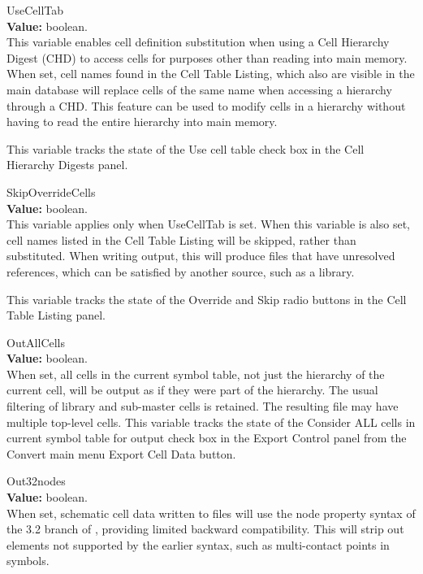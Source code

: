 \begin{description}
\item{\et UseCellTab}\\
{\bf Value:} boolean.\\
This variable enables cell definition substitution when using a Cell
Hierarchy Digest (CHD) to access cells for purposes other than reading
into main memory.  When set, cell names found in the {\cb Cell Table
Listing}, which also are visible in the main database will replace
cells of the same name when accessing a hierarchy through a CHD.  This
feature can be used to modify cells in a hierarchy without having to
read the entire hierarchy into main memory.

This variable tracks the state of the {\cb Use cell table} check box
in the {\cb Cell Hierarchy Digests} panel.

\item{\et SkipOverrideCells}\\
{\bf Value:} boolean.\\
This variable applies only when {\et UseCellTab} is set.  When this
variable is also set, cell names listed in the {\cb Cell Table
Listing} will be skipped, rather than substituted.  When writing
output, this will produce files that have unresolved references, which
can be satisfied by another source, such as a library.

This variable tracks the state of the {\cb Override} and {\cb Skip}
radio buttons in the {\cb Cell Table Listing} panel.

\item{\et OutAllCells}\\
{\bf Value:} boolean.\\
When set, all cells in the current symbol table, not just the
hierarchy of the current cell, will be output as if they were part of
the hierarchy.  The usual filtering of library and sub-master cells is
retained.  The resulting file may have multiple top-level cells.  This
variable tracks the state of the {\cb Consider ALL cells in current
symbol table for output} check box in the {\cb Export Control} panel
from the {\cb Convert} main menu {\cb Export Cell Data} button.

\item{\et Out32nodes}\\
{\bf Value:} boolean.\\
When set, schematic cell data written to files will use the {\et node}
property syntax of the 3.2 branch of {\Xic}, providing limited
backward compatibility.  This will strip out elements not supported by
the earlier syntax, such as multi-contact points in symbols.


\end{description}
